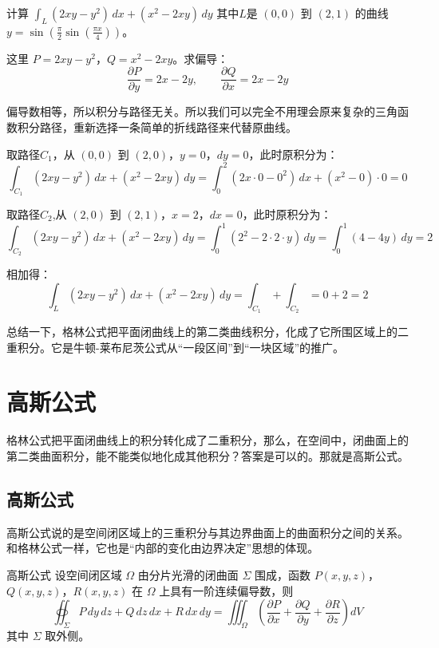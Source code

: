 \begin{myexample}
    计算 \(\int_L (2xy-y^2)\,dx + (x^2-2xy)\,dy\) 其中\(L\)是 \((0,0)\) 到 \((2,1)\) 的曲线\(y=\sin(\frac{\pi}{2}\sin(\frac{\pi x}{4}))\)。

    这里 \(P=2xy-y^2\)，\(Q=x^2-2xy\)。求偏导：
    \[
    \frac{\partial P}{\partial y} = 2x-2y,\qquad \frac{\partial Q}{\partial x} = 2x-2y
    \]

    偏导数相等，所以积分与路径无关。所以我们可以完全不用理会原来复杂的三角函数积分路径，重新选择一条简单的折线路径来代替原曲线。

    取路径\(C_1\)，从 \((0,0)\) 到 \((2,0)\)，\(y=0\)，\(dy=0\)，此时原积分为：
    \[
\int_{C_1} (2xy-y^2)\,dx + (x^2-2xy)\,dy = \int_0^2 (2x\cdot0 - 0^2)\,dx + (x^2-0)\cdot0 = 0
\]

    取路径\(C_2\),从 \((2,0)\) 到 \((2,1)\)，\(x=2\)，\(dx=0\)，此时原积分为：
    \[
    \int_{C_2} (2xy-y^2)\,dx + (x^2-2xy)\,dy = \int_0^1 (2^2 - 2\cdot2\cdot y)\,dy = \int_0^1 (4-4y)\,dy = 2
    \]

相加得：
\[\int_L (2xy-y^2)\,dx + (x^2-2xy)\,dy=\int_{C_1}+\int_{C_2}=0+2=2\]

\end{myexample}

总结一下，格林公式把平面闭曲线上的第二类曲线积分，化成了它所围区域上的二重积分。它是牛顿-莱布尼茨公式从“一段区间”到“一块区域”的推广。

\section{高斯公式}
格林公式把平面闭曲线上的积分转化成了二重积分，那么，在空间中，闭曲面上的第二类曲面积分，能不能类似地化成其他积分？答案是可以的。那就是高斯公式。
\subsection{高斯公式}
高斯公式说的是空间闭区域上的三重积分与其边界曲面上的曲面积分之间的关系。和格林公式一样，它也是“内部的变化由边界决定”思想的体现。

\begin{theorem}{高斯公式}{}
设空间闭区域 \(\Omega\) 由分片光滑的闭曲面 \(\Sigma\) 围成，函数 \(P(x,y,z)\)，\(Q(x,y,z)\)，\(R(x,y,z)\) 在 \(\Omega\) 上具有一阶连续偏导数，则
\[
\oiint_{\Sigma} P\,dy\,dz + Q\,dz\,dx + R\,dx\,dy = \iiint_{\Omega} \left( \frac{\partial P}{\partial x} + \frac{\partial Q}{\partial y} + \frac{\partial R}{\partial z} \right) dV
\]
其中 \(\Sigma\) 取外侧。
\end{theorem}

